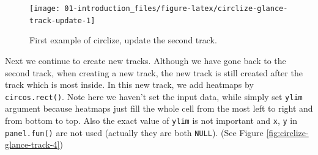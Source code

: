 \documentclass[]{book}
\newenvironment{Shaded}{\begin{snugshade}}{\end{snugshade}}
\newcommand{\KeywordTok}[1]{\textcolor[rgb]{0.13,0.29,0.53}{\textbf{#1}}}
\newcommand{\DataTypeTok}[1]{\textcolor[rgb]{0.13,0.29,0.53}{#1}}
\newcommand{\DecValTok}[1]{\textcolor[rgb]{0.00,0.00,0.81}{#1}}
\newcommand{\FloatTok}[1]{\textcolor[rgb]{0.00,0.00,0.81}{#1}}
\newcommand{\StringTok}[1]{\textcolor[rgb]{0.31,0.60,0.02}{#1}}
\newcommand{\OtherTok}[1]{\textcolor[rgb]{0.56,0.35,0.01}{#1}}
\newcommand{\ControlFlowTok}[1]{\textcolor[rgb]{0.13,0.29,0.53}{\textbf{#1}}}
\newcommand{\OperatorTok}[1]{\textcolor[rgb]{0.81,0.36,0.00}{\textbf{#1}}}
\newcommand{\NormalTok}[1]{#1}
\theoremstyle{definition}
\theoremstyle{definition}
\theoremstyle{remark}
\begin{document}
\begin{figure}

{\centering \texttt{[image: 01-introduction\_files/figure-latex/circlize-glance-track-update-1]} 

}

\caption{First example of circlize, update the second track.}\label{fig:circlize-glance-track-update}
\end{figure}

Next we continue to create new tracks. Although we have gone back to the
second track, when creating a new track, the new track is still created
after the track which is most inside. In this new track, we add heatmaps
by \texttt{circos.rect()}. Note here we haven't set the input data,
while simply set \texttt{ylim} argument because heatmaps just fill the
whole cell from the most left to right and from bottom to top. Also the
exact value of \texttt{ylim} is not important and \texttt{x}, \texttt{y}
in \texttt{panel.fun()} are not used (actually they are both
\texttt{NULL}). (See Figure \ref{fig:circlize-glance-track-4})

\begin{Shaded}
\end{Shaded}
\end{document}
